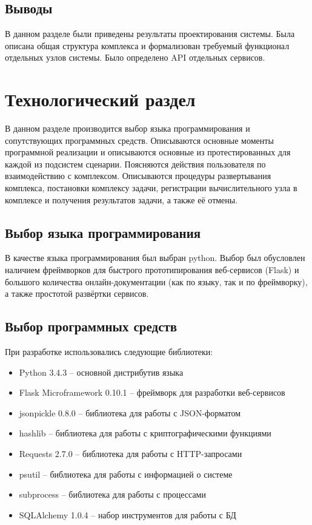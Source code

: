 \documentclass[a4paper,12pt]{report}
\numberwithin{equation}{section}
\begin{document}
  \subsection{Выводы}
  В данном разделе были приведены результаты проектирования системы.
  Была описана общая структура комплекса и формализован требуемый функционал отдельных узлов системы. 
  Было определено API отдельных сервисов.
  
  \clearpage
  \section{Технологический раздел}
  
  В данном разделе производится выбор языка программирования и сопутствующих программных средств. 
  Описываются основные моменты программной реализации и описываются основные из протестированных для каждой из подсистем сценарии.
  Поясняются действия пользователя по взаимодействию с комплексом. 
  Описываются процедуры развертывания комплекса, постановки комплексу задачи, регистрации вычислительного узла в комплексе и получения результатов задачи, а также её отмены.
  
  \subsection{Выбор языка программирования}
  В качестве языка программирования был выбран python. Выбор был обусловлен наличием фреймворков для быстрого прототипирования веб-сервисов (Flask) и большого количества онлайн-документации (как по языку, так и по фреймворку), а также простотой развёртки сервисов.
  
  \subsection{Выбор программных средств}
  При разработке использовались следующие библиотеки:
  \begin{itemize}
    \item Python 3.4.3 \cite{python} -- основной дистрибутив языка
    \item Flask Microframework 0.10.1 \cite{Flask} -- фреймворк для разработки веб-сервисов
    \item jsonpickle 0.8.0 \cite{jsonpickle} -- библиотека для работы с JSON-форматом
    \item hashlib \cite{hashlib} -- библиотека для работы с криптографическими функциями
    \item Requests 2.7.0 \cite{requests} -- библиотека для работы с HTTP-запросами
    \item psutil \cite{psutil} -- библиотека для работы с информацией о системе
    \item subprocess \cite{subprocess} -- библиотека для работы с процессами
    \item SQLAlchemy 1.0.4 \cite{sqlalchemy} -- набор инструментов для работы с БД
  \end{itemize}  
  
\end{document}
